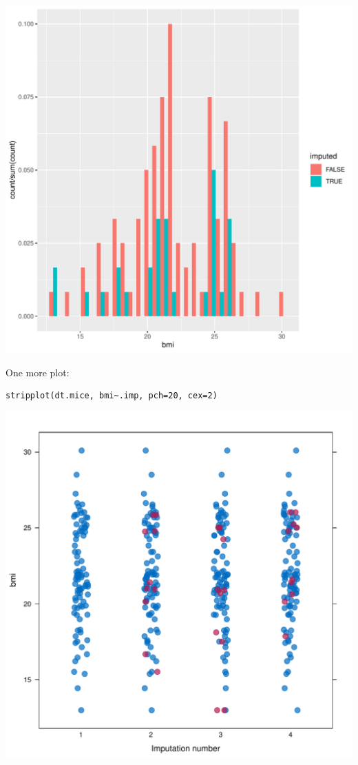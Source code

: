 \documentclass[12pt]{article}
\begin{document}
\begin{center}
\includegraphics[width=.9\linewidth]{./figures/histImputed.pdf}
\end{center}

\clearpage

One more plot:

\lstset{language=r,label= ,caption= ,captionpos=b,numbers=none}
\begin{lstlisting}
stripplot(dt.mice, bmi~.imp, pch=20, cex=2)
\end{lstlisting}

\begin{center}
\includegraphics[width=.9\linewidth]{./figures/striplotImputed.pdf}
\end{center}
\end{document}
